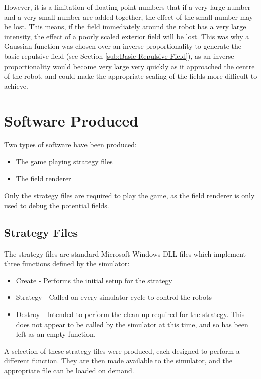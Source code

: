 \documentclass[10pt]{article}
\begin{document}
However, it is a limitation of floating point numbers that if a very large
number and a very small number are added together, the effect of the small
number may be lost.  This means, if the field immediately around the robot has a
very large intensity, the effect of a poorly scaled exterior field will be lost.
This was why a Gaussian function was chosen over an inverse proportionality to
generate the basic repulsive field (see Section
\ref{sub:Basic-Repulsive-Field}), as an inverse proportionality would become
very large very quickly as it approached the centre of the robot, and could make
the appropriate scaling of the fields more difficult to achieve.

\section{Software Produced}

Two types of software have been produced:

\begin{itemize}
\item The game playing strategy files
\item The field renderer
\end{itemize}

Only the strategy files are required to play the game, as the field renderer is
only used to debug the potential fields.

\subsection{Strategy Files}

The strategy files are standard Microsoft Windows DLL files which implement
three functions defined by the simulator:

\begin{itemize}
\item Create - Performs the initial setup for the strategy
\item Strategy - Called on every simulator cycle to control the robots
\item Destroy - Intended to perform the clean-up required for the strategy. This does not appear to be called by the simulator at this time, and so has been left as an empty function.
\end{itemize}

A selection of these strategy files were produced, each designed to perform a
different function.  They are then made available to the simulator, and the
appropriate file can be loaded on demand.
\end{document}
